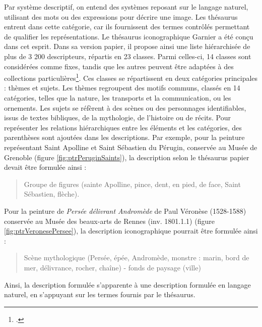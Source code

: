 Par système descriptif, on entend des systèmes reposant sur le langage naturel, utilisant des mots ou des expressions pour décrire une image. Les thésaurus entrent dans cette catégorie, car ils fournissent des termes contrôlés permettant de qualifier les représentations. Le thésaurus iconographique Garnier a été conçu dans cet esprit. Dans sa version papier, il propose ainsi une liste hiérarchisée de plus de 3 200 descripteurs, répartis en 23 classes. Parmi celles-ci, 14 classes sont considérées comme fixes, tandis que les autres peuvent être adaptées à des collections particulières\footcite[p. 15]{garnierThesaurusIconographiqueSysteme1984}. Ces classes se répartissent en deux catégories principales : thèmes et sujets. Les thèmes regroupent des motifs communs, classés en 14 catégories, telles que la nature, les transports et la communication, ou les ornements. Les sujets se réfèrent à des scènes ou des personnages identifiables, issus de textes bibliques, de la mythologie, de l’histoire ou de récits. Pour représenter les relations hiérarchiques entre les éléments et les catégories, des parenthèses sont ajoutées dans les descriptions. Par exemple, pour la peinture représentant Saint Apolline et Saint Sébastien du Pérugin, conservée au Musée de Grenoble (figure \ref{fig:ptrPeruginSaints}), la description selon le thésaurus papier devait être formulée ainsi :

\begin{quote}
Groupe de figures (sainte Apolline, pince, dent, en pied, de face, Saint Sébastien, flèche).
\end{quote}

Pour la peinture de \textit{Persée délivrant Andromède} de Paul Véronèse (1528-1588) conservée au Musée des beaux-arts de Rennes (inv. 1801.1.1) (figure \ref{fig:ptrVeronesePersee}), la description iconographique pourrait être formulée ainsi :

\begin{quote}
Scène mythologique (Persée, épée, Andromède, monstre : marin, bord de mer, délivrance, rocher, chaîne) - fonds de paysage (ville)
\end{quote}

Ainsi, la description formulée s’apparente à une description formulée en langage naturel, en s’appuyant sur les termes fournis par le thésaurus. 

